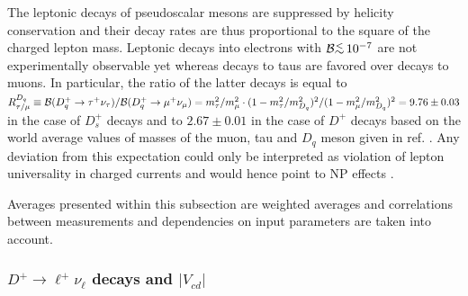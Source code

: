 The leptonic decays of pseudoscalar mesons 
are suppressed by helicity conservation and their decay rates are thus proportional to the square of 
the charged lepton mass. Leptonic decays into electrons with $\br\lesssim 10^{-7}$ are not experimentally 
observable yet whereas decays to taus are favored over decays to muons. In particular, the ratio of the 
latter decays is equal to 
$R^{D_q}_{\tau/\mu}\equiv {\cal B}(D^+_q\to\tau^+\nu_{\tau})/{\cal B}(D^+_q\to\mu^+\nu_{\mu})=m_{\tau}^2/m_{\mu}^2\cdot(1-m^2_{\tau}/m^2_{D_q})^2/(1-m^2_{\mu}/m^2_{D_q})^2=9.76\pm0.03$ 
in the case of $D_s^+$ decays and to $2.67\pm0.01$ in the case of $D^+$ decays based on the world average values of masses of the muon, tau and 
$D_q$ meson given in ref. \cite{PDG_2012}. 
Any deviation from this expectation could only be interpreted as violation of lepton universality in charged 
currents and would hence point to NP effects \cite{Filipuzzi:2012mg}.

Averages presented within this subsection are weighted averages and correlations between measurements and dependencies on input parameters
are taken into account.

\subsubsection{$D^+\to \ell^+\nu_{\ell}$ decays and $|V_{cd}|$}

